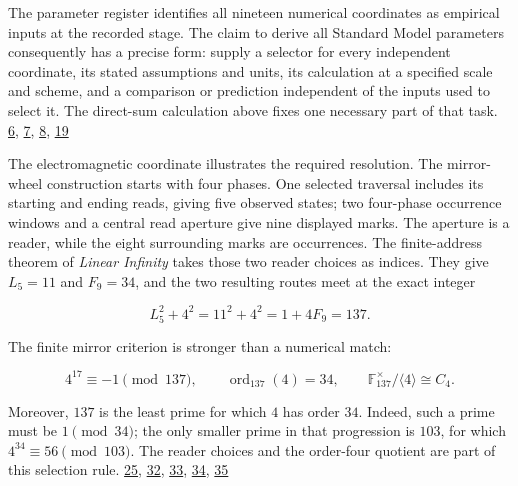 The parameter register identifies all nineteen numerical coordinates as empirical inputs at the recorded stage. The claim to derive all Standard Model parameters consequently has a precise form: supply a selector for every independent coordinate, its stated assumptions and units, its calculation at a specified scale and scheme, and a comparison or prediction independent of the inputs used to select it. The direct-sum calculation above fixes one necessary part of that task. \href{https://chatgpt.com/library?file_id=libfile_5aa28715b83881919460603dea30bc25\&account_id=personal}{6}, \href{https://chatgpt.com/library?file_id=libfile_843edf27b3e88191b692d66ea6f0de03\&account_id=personal}{7}, \href{https://chatgpt.com/library?file_id=libfile_67018da506648191b88970078f33fd1a\&account_id=personal}{8}, \href{https://pdg.lbl.gov/2026/reviews/standard_model_and_related.html}{19}

The electromagnetic coordinate illustrates the required resolution. The mirror-wheel construction starts with four phases. One selected traversal includes its starting and ending reads, giving five observed states; two four-phase occurrence windows and a central read aperture give nine displayed marks. The aperture is a reader, while the eight surrounding marks are occurrences. The finite-address theorem of \emph{Linear Infinity} takes those two reader choices as indices. They give \(L_5=11\) and \(F_9=34\), and the two resulting routes meet at the exact integer

\[
L_5^2+4^2=11^2+4^2=1+4F_9=137.
\tag{28a}
\]

The finite mirror criterion is stronger than a numerical match:

\[
4^{17}\equiv-1\pmod{137},\qquad
\operatorname{ord}_{137}(4)=34,\qquad
\mathbb F_{137}^{\times}/\langle4\rangle\cong C_4.
\tag{28a1}
\]

Moreover, \(137\) is the least prime for which \(4\) has order \(34\). Indeed, such a prime must be \(1\pmod{34}\); the only smaller prime in that progression is \(103\), for which \(4^{34}\equiv56\pmod{103}\). The reader choices and the order-four quotient are part of this selection rule. \href{https://github.com/Coppalini-Architecture/coppalini-architecture/blob/9b7122ca5c3712c2c294e2bc5097276d0ba9817b/papers/LINEAR_INFINITY_CANONICAL_v0_1.pdf}{25}, \href{https://chatgpt.com/library?file_id=libfile_d247e341311c8191bb1c0aefc5af4111\&account_id=personal}{32}, \href{https://chatgpt.com/library?file_id=libfile_7054d1b4713481918550a4bf9ef72320\&account_id=personal}{33}, \href{https://chatgpt.com/library?file_id=libfile_5167b051c248819185f3673cbcb6537d\&account_id=personal}{34}, \href{https://github.com/Coppalini-Architecture/coppalini-architecture/blob/9b7122ca5c3712c2c294e2bc5097276d0ba9817b/papers/metric-mirror-symmetry-riemanns-i-machine/metric-mirror-symmetry-riemanns-i-machine-2026-09-09.pdf}{35}

